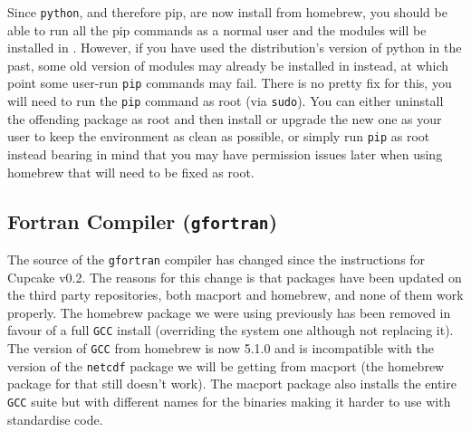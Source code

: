 \documentclass{scrartcl}
\begin{document}
Since \texttt{python}, and therefore pip, are now install from homebrew, you
should be able to run all the pip commands as a normal user and the modules
will be installed in . However,
if you have used the distribution's version of python in the past, some old
version of modules may already be installed in
 instead, at which point some
user-run \texttt{pip} commands may fail. There is no pretty fix for this, you
will need to run the \texttt{pip} command as root (via \texttt{sudo}). You can
either uninstall the offending package as root and then install or upgrade the
new one as your user to keep the  environment as clean as
possible, or simply run \texttt{pip} as root instead bearing in mind that you
may have permission issues later when using homebrew that will need to be fixed
as root.

%
%
%
%
%

\subsection{Fortran Compiler (\texttt{gfortran})}

The source of the \texttt{gfortran} compiler has changed since the instructions
for Cupcake v0.2. The reasons for this change is that packages have been
updated on the third party repositories, both macport and homebrew, and none of
them work properly. The homebrew package we were using previously has been
removed in favour of a full \texttt{GCC} install (overriding the system one
although not replacing it). The version of \texttt{GCC} from homebrew is now
5.1.0 and is incompatible with the version of the \texttt{netcdf} package we
will be getting from macport (the homebrew package for that still doesn't
work). The macport package also installs the entire \texttt{GCC} suite but with
different names for the binaries making it harder to use with standardise code.
\end{document}
